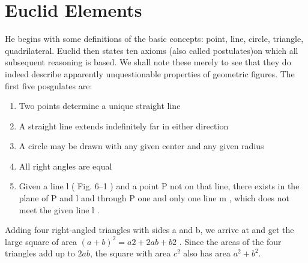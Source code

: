 \section{Euclid Elements}
He begins with some definitions of the basic concepts: point, line, circle, triangle, quadrilateral. Euclid then states ten axioms (also called postulates)on which all subsequent reasoning is based. We shall note these merely to see that they do indeed describe apparently unquestionable properties of geometric figures. The first five posgulates are:
\begin{enumerate}
    \item Two points determine a unique straight line
    \item A straight line extends indefinitely far in either direction
    \item A circle may be drawn with any given center and any given radius
    \item All right angles are equal
    \item Given a line l ( Fig. 6–1 ) and a point P not on that line, there exists in the plane of P and l and through P one and only one line m , which does not meet the given line l .
\end{enumerate}





Adding four right-angled triangles with sides a and b, we arrive at and get the large square of area $(a + b)^2 = a 2 + 2ab + b 2$ . Since the areas of the four triangles add up to $2ab$, the square with area $c^2$ also has area $a^2 + b^2$. 

